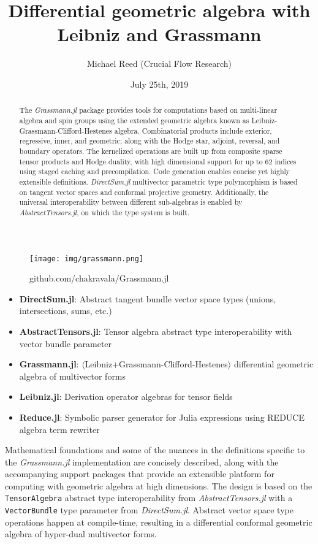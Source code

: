 \documentclass{juliacon}
\author{Michael Reed (Crucial Flow Research)}
\title{Differential geometric algebra with Leibniz and Grassmann}
\date{July 25th, 2019}
\begin{document}
%

\maketitle
\begin{figure}[ht]
\centerline{\texttt{[image: img/grassmann.png]}}
\caption*{github.com/chakravala/Grassmann.jl}
\end{figure}
\begin{abstract}
	The \textit{Grassmann.jl}
	package provides tools for computations based on multi-linear algebra and spin groups using the extended geometric algebra known as Leibniz-Grassmann-Clifford-Hestenes algebra.
	Combinatorial products include
	exterior, regressive, inner, and geometric; along with the Hodge star, adjoint, reversal, and boundary operators.
	The kernelized operations are built up from composite sparse tensor products and Hodge duality, with high dimensional support for up to 62 indices using staged caching and precompilation. Code generation enables concise yet highly extensible definitions.
	\textit{DirectSum.jl}
	multivector parametric type polymorphism is based on tangent vector spaces and conformal projective geometry.
	Additionally, the universal interoperability between different sub-algebras is enabled by \textit{AbstractTensors.jl},
	on which the type system is built.
\end{abstract}
\begin{itemize}
	\item \textbf{DirectSum.jl}: Abstract tangent bundle vector space types (unions, intersections, sums, etc.)
	\item \textbf{AbstractTensors.jl}: Tensor algebra abstract type interoperability with vector bundle parameter
	\item \textbf{Grassmann.jl}: $\langle$Leibniz+Grassmann-Clifford-Hestenes$\rangle$ differential geometric algebra of multivector forms
	\item \textbf{Leibniz.jl}: Derivation operator algebras for tensor fields
	\item \textbf{Reduce.jl}: Symbolic parser generator for Julia expressions using REDUCE algebra term rewriter
\end{itemize}
Mathematical foundations and some of the nuances in the definitions specific to the \textit{Grassmann.jl} implementation are concisely described, along with the accompanying support packages that provide an extensible platform for computing with geometric algebra at high dimensions.
The design is based on the \verb`TensorAlgebra` abstract type interoperability from \textit{AbstractTensors.jl} with a \verb`VectorBundle` type parameter from \textit{DirectSum.jl}. Abstract vector space type operations happen at compile-time, resulting in a differential conformal geometric algebra of hyper-dual multivector forms.
\end{document}
